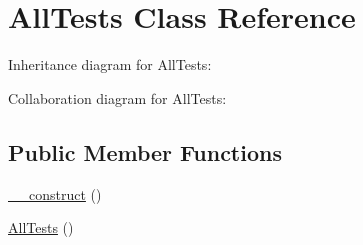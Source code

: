 \hypertarget{class_all_tests}{\section{All\-Tests Class Reference}
\label{class_all_tests}
}


Inheritance diagram for All\-Tests\-:


Collaboration diagram for All\-Tests\-:
\subsection*{Public Member Functions}
\begin{DoxyCompactItemize}
\item 
\hyperlink{class_all_tests_a095c5d389db211932136b53f25f39685}{\-\_\-\-\_\-construct} ()
\item 
\hyperlink{class_all_tests_a9edbc8177dd0d4ab2318a2785eeb6953}{All\-Tests} ()
\end{DoxyCompactItemize}
